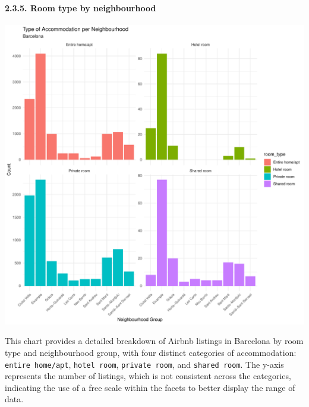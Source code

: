 \documentclass[
]{article}
\begin{document}
\hypertarget{room-type-by-neighbourhood}{%
\paragraph{2.3.5. Room type by
neighbourhood}\label{room-type-by-neighbourhood}}

\begin{center}\includegraphics{Barcelona-AirBnB-Insights_files/figure-latex/plot5-1} \end{center}

This chart provides a detailed breakdown of Airbnb listings in Barcelona
by room type and neighbourhood group, with four distinct categories of
accommodation: \texttt{entire\ home/apt}, \texttt{hotel\ room},
\texttt{private\ room}, and \texttt{shared\ room}. The y-axis represents
the number of listings, which is not consistent across the categories,
indicating the use of a free scale within the facets to better display
the range of data.
\end{document}
